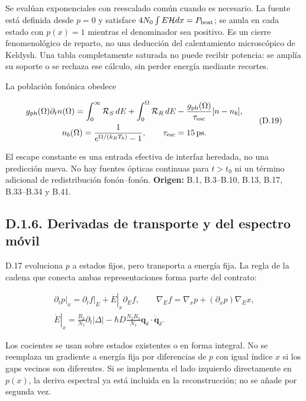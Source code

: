 \documentclass[
  spanish,
  10pt,
  a4paper,
]{article}
\begin{document}
Se evalúan exponenciales con reescalado común cuando es necesario. La
fuente está definida desde \(p=0\) y satisface
\(4N_0\int E\mathcal Hdx=P_{\rm heat}\); se anula en cada estado con
\(p(x)=1\) mientras el denominador sea positivo. Es un cierre
fenomenológico de reparto, no una deducción del calentamiento
microscópico de Keldysh. Una tabla completamente saturada no puede
recibir potencia: se amplía su soporte o se rechaza ese cálculo, sin
perder energía mediante recortes.

La población fonónica obedece

\[
\begin{gathered}
g_{\rm ph}(\Omega)\partial_tn(\Omega)
=\int_0^\infty\mathcal R_S\,dE+\int_0^\Omega\mathcal R_R\,dE
-\frac{g_{\rm ph}(\Omega)}{\tau_{\rm esc}}[n-n_b],\\
n_b(\Omega)=\frac{1}{e^{\Omega/(k_BT_b)}-1},\qquad
\tau_{\rm esc}=15\,{\rm ps}.
\end{gathered}\tag{D.19}
\]

El escape constante es una entrada efectiva de interfaz heredada, no una
predicción nueva. No hay fuentes ópticas continuas para \(t>t_0\) ni un
término adicional de redistribución fonón--fonón. \textbf{Origen:} B.1,
B.3--B.10, B.13, B.17, B.33--B.34 y B.41.

\subsection{D.1.6. Derivadas de transporte y del espectro
móvil}\label{d.1.6.-derivadas-de-transporte-y-del-espectro-muxf3vil}

D.17 evoluciona \(p\) a estados fijos, pero transporta a energía fija.
La regla de la cadena que conecta ambas representaciones forma parte del
contrato:

\[
\begin{gathered}
\left.\partial_t p\right|_x=\left.\partial_tf\right|_E
+\left.\dot E\right|_x\partial_Ef,\qquad
\nabla_E f=\nabla_x p+(\partial_xp)\nabla_E x,\\
\left.\dot E\right|_x=\frac{R_2}{N_1}\partial_t|\Delta|
-\hbar D\frac{N_2R_2}{N_1}\mathbf q_\delta\cdot\dot{\mathbf q}_\delta.
\end{gathered}\tag{D.20}
\]

Los cocientes se usan sobre estados existentes o en forma integral. No
se reemplaza un gradiente a energía fija por diferencias de \(p\) con
igual índice \(x\) si los gaps vecinos son diferentes. Si se implementa
el lado izquierdo directamente en \(p(x)\), la deriva espectral ya está
incluida en la reconstrucción; no se añade por segunda vez.
\end{document}
